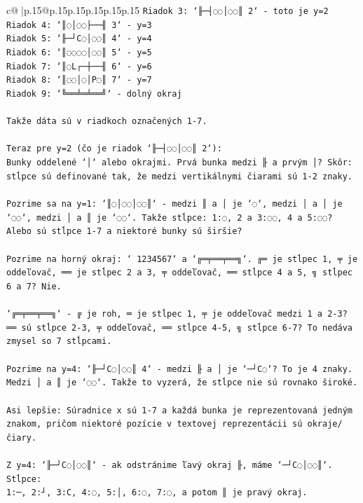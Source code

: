 \documentclass{article}
\begin{document}
{\begin{supertabular}{c@{$\;$}|p{.15\linewidth}@{}p{.15\linewidth}p{.15\linewidth}p{.15\linewidth}p{.15\linewidth}p{.15\linewidth}}
{{{\texttt{Riadok 3: `╟─┤◌◌│◌◌║ 2` {-} toto je y=2} \\
\texttt{Riadok 4: `║◌│◌◌├──╢ 3` {-} y=3} \\
\texttt{Riadok 5: `╟─┘C◌│◌◌║ 4` {-} y=4} \\
\texttt{Riadok 6: `║◌◌◌◌│◌◌║ 5` {-} y=5} \\
\texttt{Riadok 7: `║◌L┌─┼──╢ 6` {-} y=6} \\
\texttt{Riadok 8: `║◌◌│◌│P◌║ 7` {-} y=7} \\
\texttt{Riadok 9: `╚══╧═╧══╝` {-} dolný okraj} \\
\\ 
\texttt{Takže dáta sú v riadkoch označených 1{-}7.} \\
\\ 
\texttt{Teraz pre y=2 (čo je riadok `╟─┤◌◌│◌◌║ 2`):} \\
\texttt{Bunky oddelené `│` alebo okrajmi. Prvá bunka medzi ╟ a prvým │? Skôr: stĺpce sú definované tak, že medzi vertikálnymi čiarami sú 1{-}2 znaky.} \\
\\ 
\texttt{Pozrime sa na y=1: `║◌│◌◌│◌◌║` {-} medzi ║ a │ je `◌`, medzi │ a │ je `◌◌`, medzi │ a ║ je `◌◌`. Takže stĺpce: 1:◌, 2 a 3:◌◌, 4 a 5:◌◌? Alebo sú stĺpce 1{-}7 a niektoré bunky sú širšie?} \\
\\ 
\texttt{Pozrime na horný okraj: ` 1234567` a `╔═╤══╤══╗`. ╔═ je stĺpec 1, ╤ je oddeľovač, ══ je stĺpec 2 a 3, ╤ oddeľovač, ══ stĺpce 4 a 5, ╗ stĺpec 6 a 7? Nie.} \\
\\ 
\texttt{`╔═╤══╤══╗` {-} ╔ je roh, ═ je stĺpec 1, ╤ je oddeľovač medzi 1 a 2{-}3? ══ sú stĺpce 2{-}3, ╤ oddeľovač, ══ stĺpce 4{-}5, ╗ stĺpce 6{-}7? To nedáva zmysel so 7 stĺpcami.} \\
\\ 
\texttt{Pozrime na y=4: `╟─┘C◌│◌◌║ 4` {-} medzi ╟ a │ je `─┘C◌`? To je 4 znaky. Medzi │ a ║ je `◌◌`. Takže to vyzerá, že stĺpce nie sú rovnako široké.} \\
\\ 
\texttt{Asi lepšie: Súradnice x sú 1{-}7 a každá bunka je reprezentovaná jedným znakom, pričom niektoré pozície v textovej reprezentácii sú okraje/čiary.} \\
\\ 
\texttt{Z y=4: `╟─┘C◌│◌◌║` {-} ak odstránime ľavý okraj ╟, máme `─┘C◌│◌◌║`. Stĺpce:} \\
\texttt{1:─, 2:┘, 3:C, 4:◌, 5:│, 6:◌, 7:◌, a potom ║ je pravý okraj.} \\
}}}
\end{supertabular}}
\end{document}
